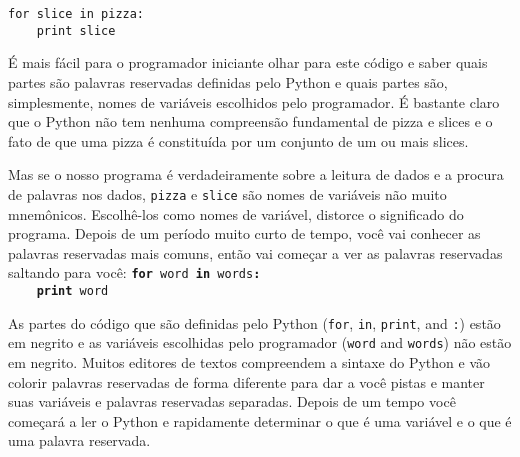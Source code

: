 {{{{{{{{{{{{{{{{{\beforeverb
\begin{verbatim}
for slice in pizza:
    print slice
\end{verbatim}
\afterverb
%
É mais fácil para o programador iniciante olhar para este código e saber quais 
partes são palavras reservadas definidas pelo Python e quais partes são, simplesmente, nomes de 
variáveis escolhidos pelo programador. É bastante claro que o Python não tem nenhuma compreensão 
fundamental de pizza e slices e o fato de que uma pizza é constituída por um conjunto 
de um ou mais slices.

Mas se o nosso programa é verdadeiramente sobre a leitura de dados e a procura de palavras nos dados, 
{\tt pizza} e {\tt slice} são nomes de variáveis não muito mnemônicos. Escolhê-los 
como nomes de variável, distorce o significado do programa.
%
Depois de um período muito curto de tempo, você vai conhecer as palavras reservadas mais comuns,
então vai começar a ver as palavras reservadas saltando para você:
{\tt {\bf for} word {\bf in} words{\bf :}\\
\verb"    "{\bf print} word }
%

As partes do código que são definidas pelo Python ({\tt for}, {\tt in}, {\tt print}, and {\tt :}) estão em negrito 
e as variáveis escolhidas pelo programador ({\tt word} and {\tt words}) não estão em negrito. 
Muitos editores de textos compreendem a sintaxe do Python 
e vão colorir palavras reservadas de forma diferente para dar a você pistas e manter 
suas variáveis e palavras reservadas separadas. 
Depois de um tempo você começará a ler o Python e rapidamente determinar o que 
é uma variável e o que é uma palavra reservada.

}}}}}}}}}}}}}}}}}
